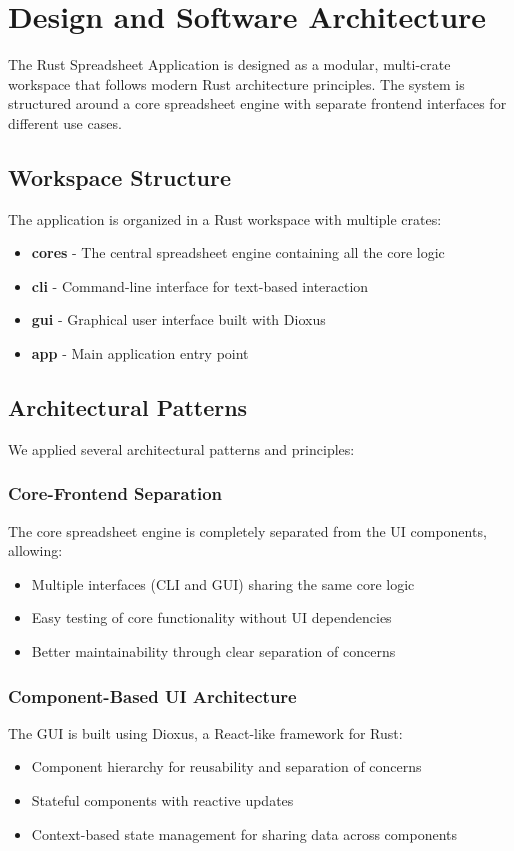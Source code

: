 \documentclass[12pt]{article}
\begin{document}
\section{Design and Software Architecture}
The Rust Spreadsheet Application is designed as a modular, multi-crate workspace that follows modern Rust architecture principles. The system is structured around a core spreadsheet engine with separate frontend interfaces for different use cases.

\subsection{Workspace Structure}
The application is organized in a Rust workspace with multiple crates:
\begin{itemize}
    \item \textbf{cores} - The central spreadsheet engine containing all the core logic
    \item \textbf{cli} - Command-line interface for text-based interaction
    \item \textbf{gui} - Graphical user interface built with Dioxus
    \item \textbf{app} - Main application entry point
\end{itemize}

\subsection{Architectural Patterns}
We applied several architectural patterns and principles:

\subsubsection{Core-Frontend Separation}
The core spreadsheet engine is completely separated from the UI components, allowing:
\begin{itemize}
    \item Multiple interfaces (CLI and GUI) sharing the same core logic
    \item Easy testing of core functionality without UI dependencies
    \item Better maintainability through clear separation of concerns
\end{itemize}

\subsubsection{Component-Based UI Architecture}
The GUI is built using Dioxus, a React-like framework for Rust:
\begin{itemize}
    \item Component hierarchy for reusability and separation of concerns
    \item Stateful components with reactive updates
    \item Context-based state management for sharing data across components
\end{itemize}
\end{document}

